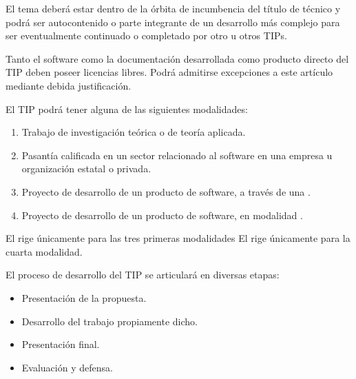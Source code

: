 \articulo El tema deberá estar dentro de la órbita de incumbencia del título de técnico y
podrá ser autocontenido o parte integrante de un desarrollo más complejo para ser
eventualmente continuado o completado por otro u otros TIPs.

\articulo Tanto el software como la documentación desarrollada como producto
directo del TIP deben poseer licencias libres. Podrá admitirse excepciones a
este artículo mediante debida justificación.

\articulo El TIP podrá tener alguna de las siguientes modalidades:
\begin{enumerate}
\item Trabajo de investigación teórica o de teoría aplicada.
\item Pasantía calificada en un sector relacionado al software en una
empresa u organización estatal o privada.
\item Proyecto de desarrollo de un producto de software, a través de una
\modoTutorado.
\item Proyecto de desarrollo de un producto de software, en modalidad \modoCursada.
\end{enumerate}

El \capTradicional rige únicamente para las tres primeras modalidades
El \capCursada rige únicamente para la cuarta modalidad.



\articulo El proceso de desarrollo del TIP se articulará en diversas etapas:
\begin{itemize}
 \item Presentación de la propuesta.
 \item Desarrollo del trabajo propiamente dicho.
 \item Presentación final.
 \item Evaluación y defensa.
\end{itemize}

